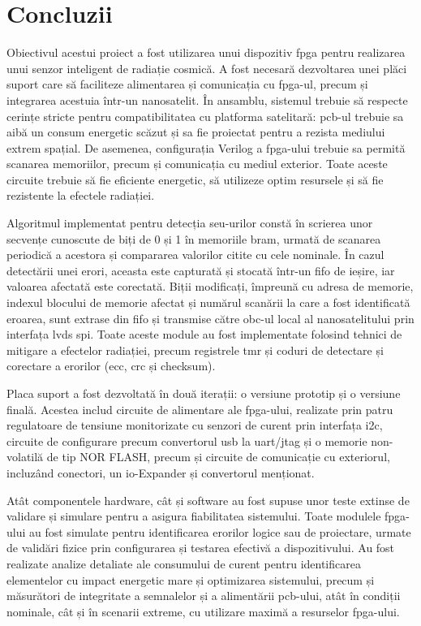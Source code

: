 \documentclass[12pt,a4paper]{report}
\begin{document}
\chapter{Concluzii}
Obiectivul acestui proiect a fost utilizarea unui dispozitiv \acrlong{fpga} pentru realizarea unui senzor inteligent de radiație cosmică. A fost necesară dezvoltarea unei plăci suport care să faciliteze alimentarea și comunicația cu \gls{fpga}-ul, precum și integrarea acestuia într-un nanosatelit. În ansamblu, sistemul trebuie să respecte cerințe stricte pentru compatibilitatea cu platforma satelitară: \gls{pcb}-ul trebuie sa aibă un consum energetic scăzut și sa fie proiectat pentru a rezista mediului extrem spațial. De asemenea, configurația Verilog a \gls{fpga}-ului trebuie sa permită scanarea memoriilor, precum și comunicația cu mediul exterior. Toate aceste circuite trebuie să fie eficiente energetic, să utilizeze optim resursele și să fie rezistente la efectele radiației.

Algoritmul implementat pentru detecția \gls{seu}-urilor constă în scrierea unor secvențe cunoscute de biți de 0 și 1 în memoriile \gls{bram}, urmată de scanarea periodică a acestora și compararea valorilor citite cu cele nominale. În cazul detectării unei erori, aceasta este capturată și stocată într-un \gls{fifo} de ieșire, iar valoarea afectată este corectată. Biții modificați, împreună cu adresa de memorie, indexul blocului de memorie afectat și numărul scanării la care a fost identificată eroarea, sunt extrase din \gls{fifo} și transmise către \gls{obc}-ul local al nanosatelitului prin interfața \gls{lvds} \gls{spi}. Toate aceste module au fost implementate folosind tehnici de mitigare a efectelor radiației, precum registrele \gls{tmr} și coduri de detectare și corectare a erorilor (\gls{ecc}, \gls{crc} și checksum).

Placa suport a fost dezvoltată în două iterații: o versiune prototip și o versiune finală. Acestea includ circuite de alimentare ale \gls{fpga}-ului, realizate prin patru regulatoare de tensiune monitorizate cu senzori de curent prin interfața \gls{i2c}, circuite de configurare precum convertorul \gls{usb} la \gls{uart}/\gls{jtag} și o memorie non-volatilă de tip NOR FLASH, precum și circuite de comunicație cu exteriorul, incluzând conectori, un \gls{io}-Expander și convertorul menționat.

Atât componentele hardware, cât și software au fost supuse unor teste extinse de validare și simulare pentru a asigura fiabilitatea sistemului. Toate modulele \gls{fpga}-ului au fost simulate pentru identificarea erorilor logice sau de proiectare, urmate de validări fizice prin configurarea și testarea efectivă a dispozitivului. Au fost realizate analize detaliate ale consumului de curent pentru identificarea elementelor cu impact energetic mare și optimizarea sistemului, precum și măsurători de integritate a semnalelor și a alimentării \gls{pcb}-ului, atât în condiții nominale, cât și în scenarii extreme, cu utilizare maximă a resurselor \gls{fpga}-ului.
\end{document}
